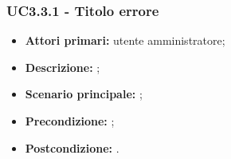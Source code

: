 \subsubsection{UC3.3.1 - Titolo errore}
\begin{itemize}
	\item \textbf{Attori primari:} utente amministratore;
	\item \textbf{Descrizione:} ;
	\item \textbf{Scenario principale:} ;
	\item \textbf{Precondizione:} ;
	\item \textbf{Postcondizione:} .
\end{itemize}